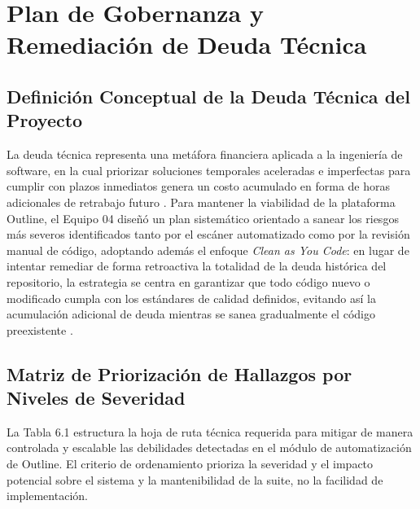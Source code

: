 \documentclass[12pt,oneside]{report}
\begin{document}
\chapter{Plan de Gobernanza y Remediación de Deuda Técnica}

\section{Definición Conceptual de la Deuda Técnica del Proyecto}

La deuda técnica representa una metáfora financiera aplicada a la ingeniería de software, en la cual priorizar soluciones temporales aceleradas e imperfectas para cumplir con plazos inmediatos genera un costo acumulado en forma de horas adicionales de retrabajo futuro \parencite{fowler2018}. Para mantener la viabilidad de la plataforma Outline, el Equipo 04 diseñó un plan sistemático orientado a sanear los riesgos más severos identificados tanto por el escáner automatizado como por la revisión manual de código, adoptando además el enfoque \textit{Clean as You Code}: en lugar de intentar remediar de forma retroactiva la totalidad de la deuda histórica del repositorio, la estrategia se centra en garantizar que todo código nuevo o modificado cumpla con los estándares de calidad definidos, evitando así la acumulación adicional de deuda mientras se sanea gradualmente el código preexistente \parencite{sommerville2011}.

\section{Matriz de Priorización de Hallazgos por Niveles de Severidad}

La Tabla 6.1 estructura la hoja de ruta técnica requerida para mitigar de manera controlada y escalable las debilidades detectadas en el módulo de automatización de Outline. El criterio de ordenamiento prioriza la severidad y el impacto potencial sobre el sistema y la mantenibilidad de la suite, no la facilidad de implementación.
\end{document}
